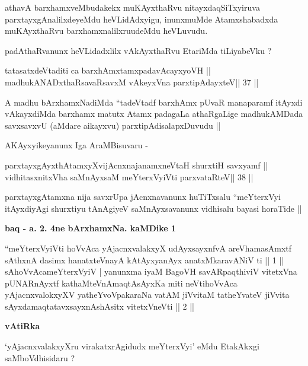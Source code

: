 \begin{artha}
athavA barxhamxveMbudakekx muKAyxthaRvu nitayxdaqSiTxyiruva
parxtayxgAnalilxdeyeMdu heVLidAdxyigu, inunxmuMde Atamxshabadxda
muKAyxthaRvu barxhamxnalilxruudeMdu heVLuvudu.

padAthaRvanunx heVLidadxlilx vAkAyxthaRvu EtariMda tiLiyabeVku ?
\end{artha}

\begin{shl}
tatasatxdeVtaditi ca barxhAmxtamxpadavAcayxyoVH ||
madhukANADxthaRsavaRsavxM vAkeyxVna parxtipAdayxteV\hfill || 37 ||
\end{shl}

\begin{artha}
A madhu bArxhamxNadiMda ``tadeVtadf barxhAmx pUvaR manaparamf itAyxdi
vAkayxdiMda barxhamx matutx Atamx padagaLa athaRgaLige madhukAMDada
savxsavxvU (aMdare aikayxvu) parxtipAdisalapxDuvudu ||

AKAyxyikeyanunx Iga AraMBisuvaru -
\end{artha}

\begin{shl}
parxtayxgAyxthAtamxyXvijAcnxnajanamxneV\s taH shurxtiH savxyamf ||
vidhitasxnitxVha saMnAyxsaM meYterxVyiVti parxvataRteV\hfill || 38 ||
\end{shl}

\begin{artha}
parxtayxgAtamxna nija savxrUpa jAcnxnavanunx huTiTxsalu ``meYterxVyi
itAyxdiyAgi shurxtiyu tAnAgiyeV saMnAyxsavanunx vidhisalu bayasi
horaTide ||
\end{artha}

\begin{center}
\textbf{baq - a. 2. 4ne bArxhamxNa. kaMDike 1}
\end{center}

\begin{shl}
``meYterxVyiVti hoVvAca yAjacnxvalakxyX udAyxsayxnfvA 
areV\s hamasAmxtf sAthxnA dasimx hanatxteV\s nayA
kAtAyxyanAyx anatxMkaravANiV ti || 1 ||
sAhoVvAcameYterxVyiV | yanunxma iyaM BagoVH
savARpaqthiviV vitetxVna pUNARnAyxtf kathaMteVnA\s maqtAsAyxKa
miti neVtihoVvAca yAjacnxvalokxyXV yatheYvoVpakaraNa
vatAM jiVvitaM tatheYvateV jiVvita sAyxdamaqtatavxsayxnAshAsitx
vitetxVneVti || 2 ||
\end{shl}

\begin{center}
\textbf{vAtiRka}
\end{center}

\begin{artha}
`yAjacnxvalakxyXru virakatxrAgidudx meYterxVyi' eMdu EtakAkxgi
  saMboVdhisidaru ?
\end{artha}

